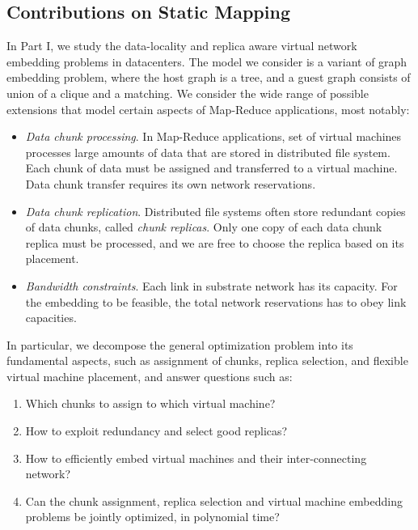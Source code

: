 \subsection{Contributions on Static Mapping}

In Part I, we study the data-locality and replica aware virtual network embedding problems in datacenters.
The model we consider is a variant of graph embedding problem, where the host graph is a tree, and a guest graph consists of union of a clique and a matching.
We consider the wide range of possible extensions that model certain aspects of Map-Reduce applications, most notably:

\begin{itemize}
\item \emph{Data chunk processing}. In Map-Reduce applications, set of virtual machines processes large amounts of data that are stored in distributed file system. Each chunk of data must be assigned and transferred to a virtual machine. Data chunk transfer requires its own network reservations.

\item \emph{Data chunk replication}. Distributed file systems often store redundant copies of data chunks, called \emph{chunk replicas}. Only one copy of each data chunk replica must be processed, and we are free to choose the replica based on its placement.

\item \emph{Bandwidth constraints}. Each link in substrate network has its capacity. For the embedding to be feasible, the total network reservations has to obey link capacities.
\end{itemize}


In particular, we decompose the general optimization problem into its fundamental aspects, such as
assignment of chunks, replica selection, and flexible virtual machine
placement, and answer questions such as:
\begin{enumerate}
\item Which chunks to assign to which virtual machine?

\item How to exploit redundancy and select good replicas?

\item How to efficiently embed virtual machines and their inter-connecting network?

\item Can the chunk assignment, replica selection and virtual machine embedding problems be jointly optimized, in polynomial time?
\end{enumerate}

